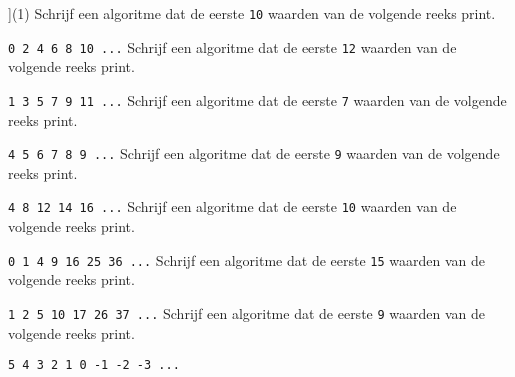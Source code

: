 \begin{exercise}
    \begin{longtasks}[counter-format=7.tsk[1]](1)
        \task
        Schrijf een algoritme dat de eerste \texttt{10} waarden van de volgende reeks print.
        
        \texttt{0 2 4 6 8 10 ...}
        \task
        Schrijf een algoritme dat de eerste \texttt{12} waarden van de volgende reeks print.

        \texttt{1 3 5 7 9 11 ...}
        \task
        Schrijf een algoritme dat de eerste \texttt{7} waarden van de volgende reeks print.

        \texttt{4 5 6 7 8 9 ...}
        \task
        Schrijf een algoritme dat de eerste \texttt{9} waarden van de volgende reeks print.

        \texttt{4 8 12 14 16 ...}
        \task
        Schrijf een algoritme dat de eerste \texttt{10} waarden van de volgende reeks print.

        \texttt{0 1 4 9 16 25 36 ...}
        \task
        Schrijf een algoritme dat de eerste \texttt{15} waarden van de volgende reeks print.

        \texttt{1 2 5 10 17 26 37 ...}
        \task
        Schrijf een algoritme dat de eerste \texttt{9} waarden van de volgende reeks print.

        \texttt{5 4 3 2 1 0 -1 -2 -3 ...}
    \end{longtasks}
\end{exercise}
